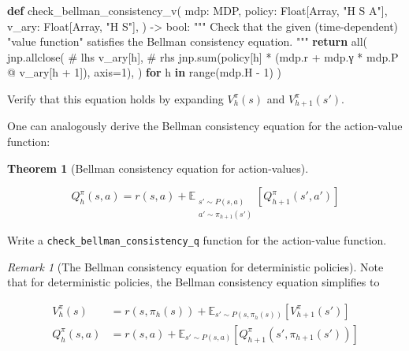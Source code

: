 \documentclass[
  letterpaper,
  DIV=11,
  numbers=noendperiod]{scrreprt}
\newenvironment{Shaded}{\begin{snugshade}}{\end{snugshade}}
\newcommand{\BuiltInTok}[1]{\textcolor[rgb]{0.00,0.23,0.31}{#1}}
\newcommand{\CommentTok}[1]{\textcolor[rgb]{0.37,0.37,0.37}{#1}}
\newcommand{\ControlFlowTok}[1]{\textcolor[rgb]{0.00,0.23,0.31}{\textbf{#1}}}
\newcommand{\DecValTok}[1]{\textcolor[rgb]{0.68,0.00,0.00}{#1}}
\newcommand{\KeywordTok}[1]{\textcolor[rgb]{0.00,0.23,0.31}{\textbf{#1}}}
\newcommand{\NormalTok}[1]{\textcolor[rgb]{0.00,0.23,0.31}{#1}}
\newcommand{\OperatorTok}[1]{\textcolor[rgb]{0.37,0.37,0.37}{#1}}
\newcommand{\StringTok}[1]{\textcolor[rgb]{0.13,0.47,0.30}{#1}}
\theoremstyle{plain}
\theoremstyle{plain}
\newtheorem{theorem}{Theorem}[chapter]
\theoremstyle{definition}
\theoremstyle{definition}
\theoremstyle{remark}
\newtheorem{refremark}{Remark}[chapter]
\begin{document}
\begin{Shaded}
\begin{Highlighting}[]
\KeywordTok{def}\NormalTok{ check\_bellman\_consistency\_v(}
\NormalTok{    mdp: MDP,}
\NormalTok{    policy: Float[Array, }\StringTok{"H S A"}\NormalTok{],}
\NormalTok{    v\_ary: Float[Array, }\StringTok{"H S"}\NormalTok{],}
\NormalTok{) }\OperatorTok{{-}\textgreater{}} \BuiltInTok{bool}\NormalTok{:}
    \CommentTok{"""}
\CommentTok{    Check that the given (time{-}dependent) "value function"}
\CommentTok{    satisfies the Bellman consistency equation.}
\CommentTok{    """}
    \ControlFlowTok{return} \BuiltInTok{all}\NormalTok{(}
\NormalTok{        jnp.allclose(}
            \CommentTok{\# lhs}
\NormalTok{            v\_ary[h],}
            \CommentTok{\# rhs}
\NormalTok{            jnp.}\BuiltInTok{sum}\NormalTok{(policy[h] }\OperatorTok{*}\NormalTok{ (mdp.r }\OperatorTok{+}\NormalTok{ mdp.γ }\OperatorTok{*}\NormalTok{ mdp.P }\OperatorTok{@}\NormalTok{ v\_ary[h }\OperatorTok{+} \DecValTok{1}\NormalTok{]), axis}\OperatorTok{=}\DecValTok{1}\NormalTok{),}
\NormalTok{        )}
        \ControlFlowTok{for}\NormalTok{ h }\KeywordTok{in} \BuiltInTok{range}\NormalTok{(mdp.H }\OperatorTok{{-}} \DecValTok{1}\NormalTok{)}
\NormalTok{    )}
\end{Highlighting}
\end{Shaded}

Verify that this equation holds by expanding \(V_h^\pi(s)\) and
\(V_{h+1}^\pi(s')\).

One can analogously derive the Bellman consistency equation for the
action-value function:

\begin{theorem}[Bellman consistency equation for
action-values]\protect\hypertarget{thm-bellman_consistency_action}{}\label{thm-bellman_consistency_action}

\[Q_h^\pi(s, a) = r(s, a) + \mathbb{E}_{\substack{s' \sim P(s, a) \\ a' \sim \pi_{h+1}(s')}} [Q_{h+1}^\pi(s', a')]\]

\end{theorem}

Write a \texttt{check\_bellman\_consistency\_q} function for the
action-value function.

\begin{refremark}[The Bellman consistency equation for deterministic
policies]
Note that for deterministic policies, the Bellman consistency equation
simplifies to

\[
\begin{aligned}
    V_h^\pi(s) &= r(s, \pi_h(s)) + \mathbb{E}_{s' \sim P(s, \pi_h(s))} [V_{h+1}^\pi(s')] \\
    Q_h^\pi(s, a) &= r(s, a) + \mathbb{E}_{s' \sim P(s, a)} [Q_{h+1}^\pi(s', \pi_{h+1}(s'))]
\end{aligned}
\]

\label{rem-bellman_det}

\end{refremark}
\end{document}
